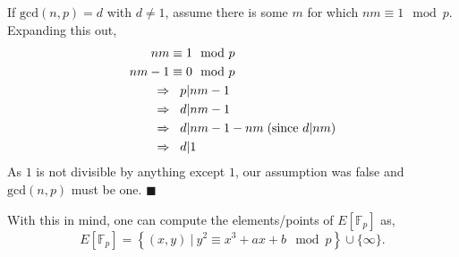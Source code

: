 \documentclass[11pt, a4paper]{report}
\newcommand{\qed}{\hfill $\blacksquare$}
\newcommand{\field}{\mathbb{F}}
\begin{document}
	If $\mathrm{gcd}(n,p) = d$ with $d \neq 1$, assume there is some $m$ for which $nm \equiv 1 \mod p$. Expanding this out,
\begin{align*}
	nm &\equiv 1 \mod p\\
	nm - 1 &\equiv 0 \mod p\\
	\Rightarrow &\hspace*{0.3cm} p | nm-1\\
	\Rightarrow &\hspace*{0.3cm} d | nm-1\\
	\Rightarrow &\hspace*{0.3cm} d | nm-1 -nm\; (\text{since } d|nm)\\
	\Rightarrow &\hspace*{0.3cm} d | 1
\end{align*}
As $1$ is not divisible by anything except $1$, our assumption was false and $\mathrm{gcd}(n,p)$ must be one.\autocite[19]{koblitz}
\qed

With this in mind, one can compute the elements/points of $E[\field_p]$ as,
\[ E[\field_p] = \left\lbrace (x,y)\ |\ y^2 \equiv x^3 + ax + b \mod p \right\rbrace \cup \lbrace \infty \rbrace. \]
\end{document}
